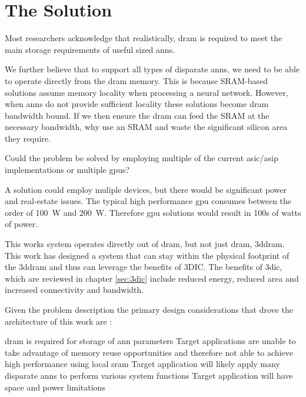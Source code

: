 \iffalse How this work addresses the problem are outlined in section \ref{chap-five}. \fi


\section[The Solution]{The Solution}
\label{sec:The Solution}

Most researchers acknowledge that realistically, \ac{dram} is required to meet the main storage requirements of useful sized \ac{ann}s.

We further believe that to support all types of disparate \ac{ann}s, we need to be able to operate directly from the \ac{dram} memory.
This is because SRAM-based solutions assume memory locality when processing a neural network. However, when \ac{ann}s do not provide sufficient locality these solutions become \ac{dram} bandwidth bound. If we then ensure the \ac{dram} can feed the SRAM at the necessary bandwidth, why use an SRAM and waste the significant silicon area they require.

Could the problem be solved by employing multiple of the current \ac{asic}/\ac{asip} implementations or multiple \acp{gpu}?

A solution could employ muliple devices, but there would be significant power and real-estate issues. The typical high performance \ac{gpu} consumes between the order of \SI{100}{\watt} and \SI{200}{\watt}.
Therefore \ac{gpu} solutions would result in 100s of watts of power.


This works system operates directly out of \ac{dram}, but not just \ac{dram}, \ac{3ddram}.
This work has designed a system that can stay within the physical footprint of the \ac{3ddram} and thus can leverage the benefits of 3DIC.
The benefits of \ac{3dic}, which are reviewed in chapter \ref{sec:3dic} include reduced energy, reduced area and increased connectivity and bandwidth.

\iffalse
Therefore, this work is able to propose a custom 3D-\ac{dram} that exposes more of the \ac{dram}s internal page and thus generates interface bandwidth that is of the order of 64 times that of the standard ac{3ddram}.
\fi

Given the problem description \iffalse outlined in section \ref{sec:The Problem},\fi the primary design considerations that drove the architecture of this work are :
\begin{outline}
  \1 \ac{dram} is required for storage of \ac{ann} parameters 
  \1 Target applications are unable to take advantage of memory reuse opportunities and therefore not able to achieve high performance using local \ac{sram} \iffalse to store \ac{ann} parameters or the \ac{ann} input \fi
  \1 Target application will likely apply many disparate \acp{ann} to perform various system functions
  \1 Target application will have space and power limitations
\end{outline}

